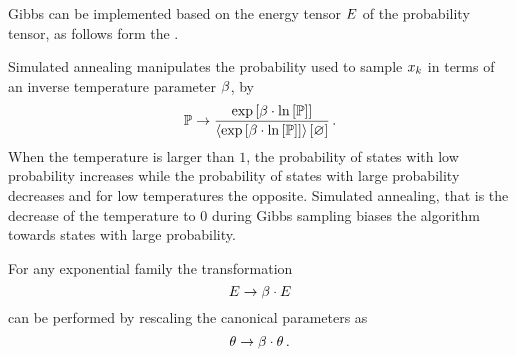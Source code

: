 
Gibbs can be implemented based on the energy tensor $E$ of the probability tensor, as follows form the .



	








	Simulated annealing manipulates the probability used to sample $x_{k}$ in terms of an inverse temperature parameter $\beta$, by
		\[ \mathbb{P} \rightarrow \frac{\mathrm{exp}\left[\beta\cdot\ln \left[ \mathbb{P} \right]\right]}{\left\langle \mathrm{exp}\left[\beta\cdot\ln \left[ \mathbb{P} \right]\right]\right\rangle \left[ \varnothing \right] } \, . \]
	When the temperature is larger than $1$, the probability of states with low probability increases while the probability of states with large probability decreases and for low temperatures the opposite.
	Simulated annealing, that is the decrease of the temperature to $0$ during Gibbs sampling biases the algorithm towards states with large probability.

	For any exponential family the transformation 
		\[ E \rightarrow \beta \cdot E  \]
	can be performed by rescaling the canonical parameters as
		\[ \theta \rightarrow \beta \cdot \theta \, . \]








